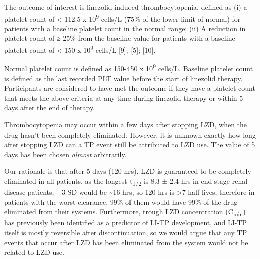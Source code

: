 \documentclass[
  letterpaper,
  DIV=11,
  numbers=noendperiod]{scrartcl}
\begin{document}
The outcome of interest is linezolid-induced thrombocytopenia, defined
as (i) a platelet count of \textless{} 112.5 x 10\textsuperscript{9}
cells/L (75\% of the lower limit of normal) for patients with a baseline
platelet count in the normal range; (ii) A reduction in platelet count
of ≥ 25\% from the baseline value for patients with a baseline platelet
count of \textless{} 150 x 10\textsuperscript{9} cells/L {[}9{]};
{[}5{]}; {[}10{]}.

Normal platelet count is defined as 150-450 x 10\textsuperscript{9}
cells/L. Baseline platelet count is defined as the last recorded PLT
value before the start of linezolid therapy. Participants are considered
to have met the outcome if they have a platelet count that meets the
above criteria at any time during linezolid therapy or within 5 days
after the end of therapy.

\begin{tcolorbox}[enhanced jigsaw, colback=white, title=\textcolor{quarto-callout-warning-color}{\faExclamationTriangle}\hspace{0.5em}{Warning}, opacityback=0, opacitybacktitle=0.6, bottomtitle=1mm, leftrule=.75mm, toprule=.15mm, bottomrule=.15mm, breakable, toptitle=1mm, titlerule=0mm, arc=.35mm, rightrule=.15mm, colframe=quarto-callout-warning-color-frame, coltitle=black, left=2mm, colbacktitle=quarto-callout-warning-color!10!white]

Thrombocytopenia may occur within a few days after stopping LZD, when
the drug hasn't been completely eliminated. However, it is unknown
exactly how long after stopping LZD can a TP event still be attributed
to LZD use. The value of 5 days has been chosen \emph{almost}
arbitrarily.

Our rationale is that after 5 days (120 hrs), LZD is guaranteed to be
completely eliminated in all patients, as the longest
t\textsubscript{1/2} is 8.3 ± 2.4 hrs in end-stage renal disease
patients, +3 SD would be \textasciitilde16 hrs, so 120 hrs is
\textgreater7 half-lives, therefore in patients with the worst
clearance, 99\% of them would have 99\% of the drug eliminated from
their systems. Furthermore, trough LZD concentration
(C\textsubscript{min}) has previously been identified as a predictor of
LI-TP development, and LI-TP itself is mostly reversible after
discontinuation, so we would argue that any TP events that occur after
LZD has been eliminated from the system would not be related to LZD use.

\end{tcolorbox}
\end{document}
